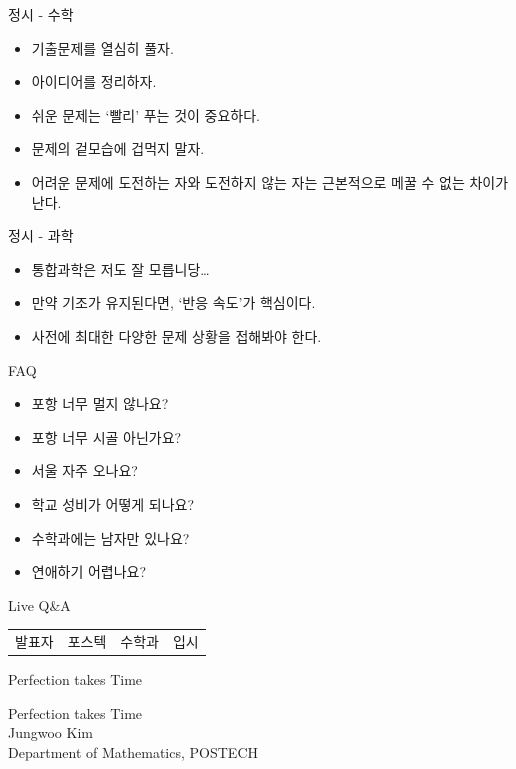 \documentclass[12pt,aspectratio=169]{beamer}
\newenvironment{mainitemize}{\begin{itemize}\setlength{\itemsep}{0.72em}}{\end{itemize}}
\begin{document}
\begin{frame}{정시 - 수학}
\begin{mainitemize}
  \item 기출문제를 열심히 풀자.
  \item 아이디어를 정리하자.
  \item 쉬운 문제는 ‘빨리’ 푸는 것이 중요하다.
  \item 문제의 겉모습에 겁먹지 말자.
  \item 어려운 문제에 도전하는 자와 도전하지 않는 자는 근본적으로 메꿀 수 없는 차이가 난다.
\end{mainitemize}
\end{frame}

\begin{frame}{정시 - 과학}
\begin{mainitemize}
  \item 통합과학은 저도 잘 모릅니당\ldots
  \item 만약 기조가 유지된다면, ‘반응 속도’가 핵심이다.
  \item 사전에 최대한 다양한 문제 상황을 접해봐야 한다.
\end{mainitemize}
\end{frame}

\begin{frame}{FAQ}
\begin{mainitemize}
  \item 포항 너무 멀지 않나요?
  \item 포항 너무 시골 아닌가요?
  \item 서울 자주 오나요?
  \item 학교 성비가 어떻게 되나요?
  \item 수학과에는 남자만 있나요?
  \item 연애하기 어렵나요?
\end{mainitemize}
\end{frame}

\begin{frame}{Live Q\&A}
\vfill
\begin{center}
\begin{tabular}{cccc}
{\Large 발표자} & {\Large 포스텍} & {\Large 수학과} & {\Large 입시}
\end{tabular}
\end{center}
\vfill
\end{frame}

\begin{frame}{Perfection takes Time}
\vfill
\begin{center}
{\Large Perfection takes Time}\\[1.2em]
Jungwoo Kim\\
Department of Mathematics, POSTECH
\end{center}
\vfill
\end{frame}
\end{document}
